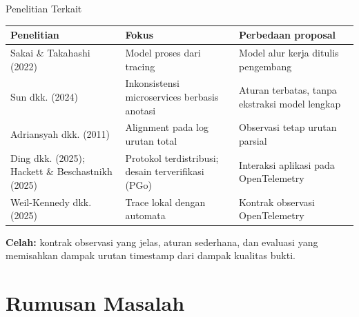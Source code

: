 \documentclass[11pt,aspectratio=169,t]{beamer}
\begin{document}
\begin{frame}{Penelitian Terkait}
\footnotesize
\renewcommand{\arraystretch}{1.0}
\begin{tabularx}{\textwidth}{@{}p{4.3cm}XX@{}}
\toprule
Penelitian & Fokus & Perbedaan proposal \\
\midrule
Sakai \& Takahashi (2022) & Model proses dari tracing & Model alur kerja ditulis pengembang \\
Sun dkk. (2024) & Inkonsistensi microservices berbasis anotasi & Aturan terbatas, tanpa ekstraksi model lengkap \\
Adriansyah dkk. (2011) & Alignment pada log urutan total & Observasi tetap urutan parsial \\
Ding dkk. (2025); Hackett \& Beschastnikh (2025) & Protokol terdistribusi; desain terverifikasi (PGo) & Interaksi aplikasi pada OpenTelemetry \\
Weil-Kennedy dkk. (2025) & Trace lokal dengan automata & Kontrak observasi OpenTelemetry \\
\bottomrule
\end{tabularx}
\medskip

\textbf{Celah:} kontrak observasi yang jelas, aturan sederhana, dan evaluasi yang memisahkan dampak urutan timestamp dari dampak kualitas bukti.
\end{frame}

\section{Rumusan Masalah}
\end{document}
